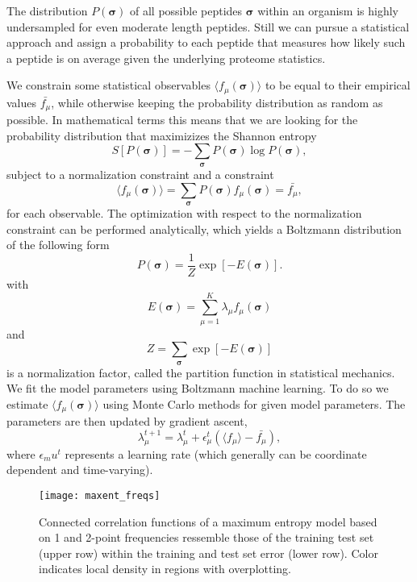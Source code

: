 \documentclass[superscriptaddress,twocolumn,pre]{revtex4}
\newcommand{\B}{\boldsymbol}
\newcommand{\<}{\langle}
\renewcommand{\>}{\rangle}
\begin{document}
The distribution $P(\B \sigma)$ of all possible peptides $\B \sigma$ within an organism is highly undersampled for even moderate length peptides. Still we can pursue a statistical approach and assign a probability to each peptide that measures how likely such a peptide is on average given the underlying proteome statistics.

We constrain some statistical observables $\langle f_\mu(\boldsymbol \sigma)\rangle$ to be equal to their empirical values $\bar{f_\mu}$, while otherwise keeping the probability distribution as random as possible. In mathematical terms this means that we are looking for the probability distribution that maximizizes the Shannon entropy
\begin{equation}
    S[P(\B \sigma)] = - \sum_{\B \sigma} P(\B \sigma) \log P(\B \sigma),
\end{equation}
subject to a normalization constraint and a constraint
\begin{equation}
    \langle f_\mu(\boldsymbol \sigma)\rangle = \sum_{\boldsymbol \sigma} P(\boldsymbol \sigma) f_\mu(\boldsymbol \sigma) = \bar{f_\mu},
\end{equation}
for each observable.
The optimization with respect to the normalization constraint can be performed analytically, which yields a Boltzmann distribution of the following form
\begin{equation}
    P(\boldsymbol \sigma) = \frac{1}{Z} \exp\left[ -E(\B \sigma) \right].
\end{equation}
with 
\begin{equation}
 E(\B \sigma) = \sum_{\mu=1}^K \lambda_\mu f_\mu(\boldsymbol \sigma)
\end{equation}
and 
\begin{equation}
    Z = \sum_{\B \sigma} \exp \left[ - E(\B \sigma) \right]
\end{equation}
    is a normalization factor, called the partition function in statistical mechanics.
We fit the model parameters using Boltzmann machine learning. To do so we estimate $\langle f_\mu(\B \sigma)\rangle$ using Monte Carlo methods for given model parameters. The parameters are then updated by gradient ascent,
\begin{equation}
    \lambda_\mu^{t+1} = \lambda_\mu^t + \epsilon_\mu^t \left(\langle f_\mu \rangle  - \bar{f_\mu}\right),
\end{equation}
where $\epsilon_mu^t$ represents a learning rate (which generally can be coordinate dependent and time-varying).


\begin{figure*}
    \texttt{[image: maxent\_freqs]}
    \caption{Connected correlation functions of a maximum entropy model based on 1 and 2-point frequencies ressemble those of the training test set (upper row) within the training and test set error (lower row). Color indicates local density in regions with overplotting.
    \label{figmaxent_freqs}
    }
\end{figure*}
\end{document}
